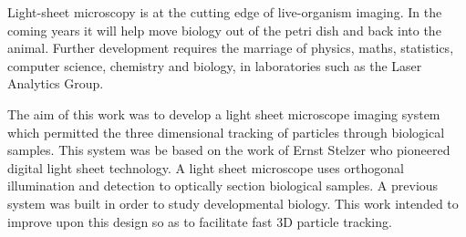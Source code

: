Light-sheet microscopy is at the cutting edge of live-organism imaging.
In the coming years it will help move biology out of the petri dish and back into the animal.
Further development requires the marriage of physics, maths, statistics, computer science, chemistry and biology, in laboratories such as the Laser Analytics Group.



The aim of this work was to develop a light sheet microscope imaging system which permitted the three dimensional tracking of particles through biological samples.
This system was be based on the work of Ernst Stelzer who pioneered digital light sheet technology\cite{Huisken2004}.
A light sheet microscope uses orthogonal illumination and detection to optically section biological samples.
A previous system was built in order to study developmental biology.
This work intended to improve upon this design so as to facilitate fast 3D particle tracking.

\pagebreak
